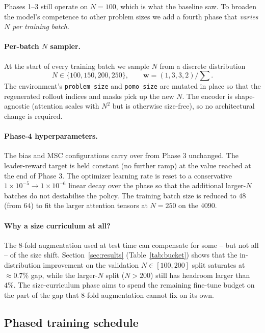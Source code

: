 \documentclass[11pt,a4paper]{article}
\begin{document}
Phases 1--3 still operate on $N=100$, which is what the baseline saw.
To broaden the model's competence to other problem sizes we add a fourth
phase that \emph{varies $N$ per training batch}.

\paragraph{Per-batch $N$ sampler.} At the start of every training batch we
sample $N$ from a discrete distribution
\[
  N \in \{100, 150, 200, 250\}, \qquad
  \mathbf{w} = (1, 3, 3, 2)/\sum.
\]
The environment's \texttt{problem\_size} and \texttt{pomo\_size} are mutated
in place so that the regenerated rollout indices and masks pick up the new
$N$. The encoder is shape-agnostic (attention scales with $N^2$ but is
otherwise size-free), so no architectural change is required.

\paragraph{Phase-4 hyperparameters.} The bias and MSC configurations carry
over from Phase 3 unchanged. The leader-reward target is held constant
(no further ramp) at the value reached at the end of Phase 3. The optimizer
learning rate is reset to a conservative
$1{\times}10^{-5} \to 1{\times}10^{-6}$ linear decay over the phase so that
the additional larger-$N$ batches do not destabilise the policy. The
training batch size is reduced to $48$ (from $64$) to fit the larger
attention tensors at $N=250$ on the 4090.

\paragraph{Why a size curriculum at all?} The 8-fold augmentation used at
test time can compensate for some -- but not all -- of the size shift.
Section~\ref{sec:results} (Table~\ref{tab:bucket}) shows that the
in-distribution improvement on the validation $N\!\in\![100,200]$ split
saturates at $\approx 0.7\%$ gap, while the larger-$N$ split ($N>200$)
still has headroom larger than $4\%$. The size-curriculum phase aims to
spend the remaining fine-tune budget on the part of the gap that 8-fold
augmentation cannot fix on its own.

\subsection{Phased training schedule}
\end{document}
